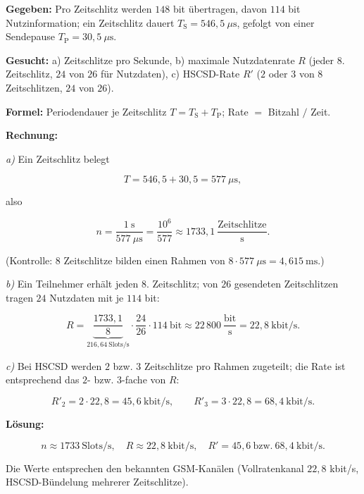\begin{beispiel}

\textbf{Gegeben:} Pro Zeitschlitz werden $148$ bit übertragen, davon $114$ bit
Nutzinformation; ein Zeitschlitz dauert $T_{\text{S}} = 546{,}5\ \mu\text{s}$,
gefolgt von einer Sendepause $T_{\text{P}} = 30{,}5\ \mu\text{s}$.

\textbf{Gesucht:} a) Zeitschlitze pro Sekunde, b) maximale Nutzdatenrate $R$
(jeder $8$. Zeitschlitz, $24$ von $26$ für Nutzdaten), c) HSCSD-Rate $R'$
($2$ oder $3$ von $8$ Zeitschlitzen, $24$ von $26$).

\textbf{Formel:} Periodendauer je Zeitschlitz
$T = T_{\text{S}} + T_{\text{P}}$; Rate $=$ Bitzahl $/$ Zeit.

\textbf{Rechnung:}

\emph{a)} Ein Zeitschlitz belegt

$$
T = 546{,}5 + 30{,}5 = 577\ \mu\text{s},
$$

also

$$
n = \frac{1\ \text{s}}{577\ \mu\text{s}} = \frac{10^6}{577}
\approx 1733{,}1\ \frac{\text{Zeitschlitze}}{\text{s}}.
$$

(Kontrolle: $8$ Zeitschlitze bilden einen Rahmen von
$8\cdot 577\ \mu\text{s} = 4{,}615\ \text{ms}$.)

\emph{b)} Ein Teilnehmer erhält jeden $8$. Zeitschlitz; von $26$ gesendeten
Zeitschlitzen tragen $24$ Nutzdaten mit je $114$ bit:

$$
R = \underbrace{\frac{1733{,}1}{8}}_{216{,}64\ \text{Slots/s}}
\cdot \frac{24}{26}\cdot 114\ \text{bit}
\approx 22\,800\ \frac{\text{bit}}{\text{s}} = 22{,}8\ \text{kbit/s}.
$$

\emph{c)} Bei HSCSD werden $2$ bzw. $3$ Zeitschlitze pro Rahmen zugeteilt; die
Rate ist entsprechend das $2$- bzw. $3$-fache von $R$:

$$
R'_{2} = 2\cdot 22{,}8 = 45{,}6\ \text{kbit/s}, \qquad
R'_{3} = 3\cdot 22{,}8 = 68{,}4\ \text{kbit/s}.
$$

\textbf{Lösung:}

$$
\boxed{\;n \approx 1733\ \text{Slots/s}, \quad R \approx 22{,}8\ \text{kbit/s},
\quad R' = 45{,}6\ \text{bzw.}\ 68{,}4\ \text{kbit/s}.\;}
$$

Die Werte entsprechen den bekannten GSM-Kanälen (Vollratenkanal
$22{,}8$ kbit/s, HSCSD-Bündelung mehrerer Zeitschlitze).

\end{beispiel}

